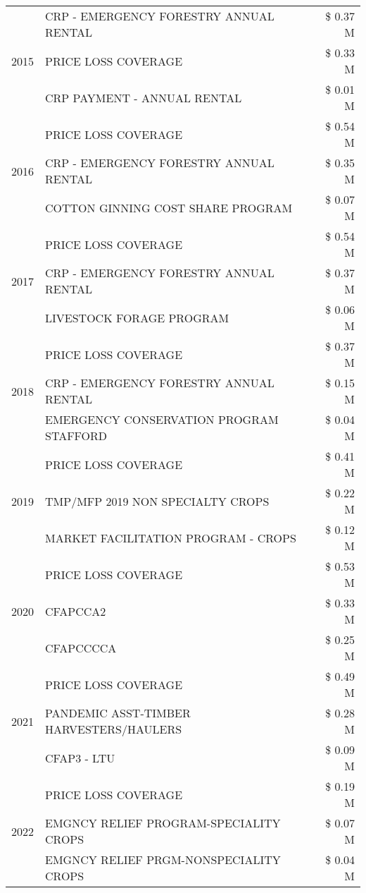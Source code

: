 \begin{tabular}{llr}
\cline{1-3}
\multirow[t]{3}{*}{2015} & CRP - EMERGENCY FORESTRY ANNUAL RENTAL & \$ 0.37 M \\
 & PRICE LOSS COVERAGE & \$ 0.33 M \\
 & CRP PAYMENT - ANNUAL RENTAL & \$ 0.01 M \\
\cline{1-3}
\multirow[t]{3}{*}{2016} & PRICE LOSS COVERAGE & \$ 0.54 M \\
 & CRP - EMERGENCY FORESTRY ANNUAL RENTAL & \$ 0.35 M \\
 & COTTON GINNING COST SHARE PROGRAM & \$ 0.07 M \\
\cline{1-3}
\multirow[t]{3}{*}{2017} & PRICE LOSS COVERAGE & \$ 0.54 M \\
 & CRP - EMERGENCY FORESTRY ANNUAL RENTAL & \$ 0.37 M \\
 & LIVESTOCK FORAGE PROGRAM & \$ 0.06 M \\
\cline{1-3}
\multirow[t]{3}{*}{2018} & PRICE LOSS COVERAGE & \$ 0.37 M \\
 & CRP - EMERGENCY FORESTRY ANNUAL RENTAL & \$ 0.15 M \\
 & EMERGENCY CONSERVATION PROGRAM STAFFORD & \$ 0.04 M \\
\cline{1-3}
\multirow[t]{3}{*}{2019} & PRICE LOSS COVERAGE & \$ 0.41 M \\
 & TMP/MFP 2019 NON SPECIALTY CROPS & \$ 0.22 M \\
 & MARKET FACILITATION PROGRAM - CROPS & \$ 0.12 M \\
\cline{1-3}
\multirow[t]{3}{*}{2020} & PRICE LOSS COVERAGE & \$ 0.53 M \\
 & CFAPCCA2 & \$ 0.33 M \\
 & CFAPCCCCA & \$ 0.25 M \\
\cline{1-3}
\multirow[t]{3}{*}{2021} & PRICE LOSS COVERAGE & \$ 0.49 M \\
 & PANDEMIC ASST-TIMBER HARVESTERS/HAULERS & \$ 0.28 M \\
 & CFAP3 - LTU & \$ 0.09 M \\
\cline{1-3}
\multirow[t]{3}{*}{2022} & PRICE LOSS COVERAGE & \$ 0.19 M \\
 & EMGNCY RELIEF PROGRAM-SPECIALITY CROPS & \$ 0.07 M \\
 & EMGNCY RELIEF PRGM-NONSPECIALITY CROPS & \$ 0.04 M \\
\cline{1-3}
\bottomrule
\end{tabular}
